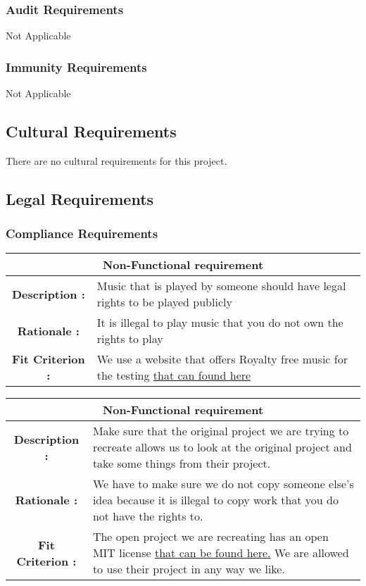 \documentclass[12pt, titlepage]{article}
\begin{document}
\subsubsection{Audit Requirements}
Not Applicable
\subsubsection{Immunity Requirements}
Not Applicable

\subsection{Cultural Requirements}
There are no cultural requirements for this project.
\subsection{Legal Requirements}
\subsubsection{Compliance Requirements}

\begin{center}
\begin{table}[H]
\begin{tabularx}{\textwidth}{| c X |}
\hline
\multicolumn{2}{|c|}{\textbf{Non-Functional requirement}}\\
\hline
\textbf{Description : } &  Music that is played by someone should have legal rights to be played publicly \\
\hline
\textbf{Rationale : } & It is illegal to play music that you do not own the rights to play \\
\hline
\textbf{Fit Criterion : } & We use a website that offers Royalty free music for the testing \href{http://www.bensound.com/}{that can found here} \\
\hline
\end{tabularx}
\end{table}
\end{center}

\begin{center}
\begin{table} [H]
\begin{tabularx}{\textwidth}{| c X |}
\hline
\multicolumn{2}{|c|}{\textbf{Non-Functional requirement}}\\
\hline
\textbf{Description : } & Make sure that the original project we are trying to recreate allows us to look at the original project and take some things from their project. \\
\hline
\textbf{Rationale : } & We have to make sure we do not copy someone else's idea because it is illegal to copy work that you do not have the rights to. \\
\hline
\textbf{Fit Criterion : } & The open project we are recreating has an open MIT license \href{LICENSE.txt} {that can be found here.} We are allowed to use their project in any way we like.\\
\hline
\end{tabularx}
\end{table}
\end{center}
\end{document}
